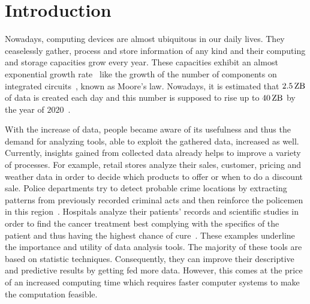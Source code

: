 \documentclass{dima}
\begin{document}
\date{\today}


\maketitle



\section{Introduction}
Nowadays, computing devices are almost ubiquitous in our daily lives.
They ceaselessly gather, process and store information of any kind and their computing and storage capacities grow every year.
These capacities exhibit an almost exponential growth rate~\cite{hilbert:s2011a} like the growth of the number of components on integrated circuits~\cite{moore:1965a}, known as Moore's law.
Nowadays, it is estimated that $\SI{2.5}{\zetta\byte}$ of data is created each day and this number is supposed to rise up to $\SI{40}{\zetta\byte}$ by the year of $\num{2020}$~\cite{ibm:2014a}.

With the increase of data, people became aware of its usefulness and thus the demand for analyzing tools, able to exploit the gathered data, increased as well.
Currently, insights gained from collected data already helps to improve a variety of processes.
For example, retail stores analyze their sales, customer, pricing and weather data in order to decide which products to offer or  when to do a discount sale. 
Police departments try to detect probable crime locations by extracting patterns from previously recorded criminal acts and then  reinforce the policemen in  this region~\cite{lohr:yt2012a}. 
Hospitals analyze their patients' records and scientific studies in order to find the cancer treatment best complying with the  specifics of the patient and thus having the highest chance of cure~\cite{mskcc:2013a}. 
These examples underline the importance and utility of data analysis tools. 
The majority of these tools are based on statistic techniques. 
Consequently, they can improve their descriptive and predictive results by getting fed more data.
However, this comes at the price of an increased computing time which requires faster computer systems to make the computation feasible.
\end{document}

